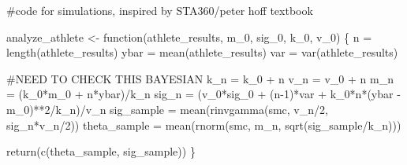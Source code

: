 \documentclass[
  letterpaper,
  DIV=11,
  numbers=noendperiod]{scrartcl}
\newenvironment{Shaded}{\begin{snugshade}}{\end{snugshade}}
\newcommand{\CommentTok}[1]{\textcolor[rgb]{0.37,0.37,0.37}{#1}}
\newcommand{\ControlFlowTok}[1]{\textcolor[rgb]{0.00,0.23,0.31}{#1}}
\newcommand{\DecValTok}[1]{\textcolor[rgb]{0.68,0.00,0.00}{#1}}
\newcommand{\FunctionTok}[1]{\textcolor[rgb]{0.28,0.35,0.67}{#1}}
\newcommand{\NormalTok}[1]{\textcolor[rgb]{0.00,0.23,0.31}{#1}}
\newcommand{\OtherTok}[1]{\textcolor[rgb]{0.00,0.23,0.31}{#1}}
\newcommand{\SpecialCharTok}[1]{\textcolor[rgb]{0.37,0.37,0.37}{#1}}
\begin{document}
\begin{Shaded}
\begin{Highlighting}[]
\CommentTok{\#code for simulations, inspired by STA360/peter hoff textbook}

\NormalTok{analyze\_athlete }\OtherTok{\textless{}{-}} \ControlFlowTok{function}\NormalTok{(athlete\_results, m\_0, sig\_0, k\_0, v\_0) \{}
\NormalTok{  n }\OtherTok{=} \FunctionTok{length}\NormalTok{(athlete\_results)}
\NormalTok{  ybar }\OtherTok{=} \FunctionTok{mean}\NormalTok{(athlete\_results)}
\NormalTok{  var }\OtherTok{=} \FunctionTok{var}\NormalTok{(athlete\_results)}
  
  \CommentTok{\#NEED TO CHECK THIS BAYESIAN}
\NormalTok{  k\_n }\OtherTok{=}\NormalTok{ k\_0 }\SpecialCharTok{+}\NormalTok{ n}
\NormalTok{  v\_n }\OtherTok{=}\NormalTok{ v\_0 }\SpecialCharTok{+}\NormalTok{ n}
\NormalTok{  m\_n }\OtherTok{=}\NormalTok{ (k\_0}\SpecialCharTok{*}\NormalTok{m\_0 }\SpecialCharTok{+}\NormalTok{ n}\SpecialCharTok{*}\NormalTok{ybar)}\SpecialCharTok{/}\NormalTok{k\_n}
\NormalTok{  sig\_n }\OtherTok{=}\NormalTok{ (v\_0}\SpecialCharTok{*}\NormalTok{sig\_0 }\SpecialCharTok{+}\NormalTok{ (n}\DecValTok{{-}1}\NormalTok{)}\SpecialCharTok{*}\NormalTok{var }\SpecialCharTok{+}\NormalTok{ k\_0}\SpecialCharTok{*}\NormalTok{n}\SpecialCharTok{*}\NormalTok{(ybar }\SpecialCharTok{{-}}\NormalTok{ m\_0)}\SpecialCharTok{**}\DecValTok{2}\SpecialCharTok{/}\NormalTok{k\_n)}\SpecialCharTok{/}\NormalTok{v\_n}
\NormalTok{  sig\_sample }\OtherTok{=} \FunctionTok{mean}\NormalTok{(}\FunctionTok{rinvgamma}\NormalTok{(smc, v\_n}\SpecialCharTok{/}\DecValTok{2}\NormalTok{, sig\_n}\SpecialCharTok{*}\NormalTok{v\_n}\SpecialCharTok{/}\DecValTok{2}\NormalTok{))}
\NormalTok{  theta\_sample }\OtherTok{=} \FunctionTok{mean}\NormalTok{(}\FunctionTok{rnorm}\NormalTok{(smc, m\_n, }\FunctionTok{sqrt}\NormalTok{(sig\_sample}\SpecialCharTok{/}\NormalTok{k\_n)))}
  
  \FunctionTok{return}\NormalTok{(}\FunctionTok{c}\NormalTok{(theta\_sample, sig\_sample))}
\NormalTok{\}}
\end{Highlighting}
\end{Shaded}
\end{document}
